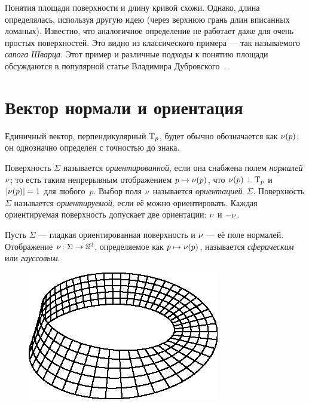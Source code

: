 Понятия площади поверхности и длину кривой схожи.
Однако, длина определялась, используя другую идею (через верхнюю грань длин вписанных ломаных).
Известно, что аналогичное определение не работает даже для очень простых поверхностей.
Это видно из классического примера --- так называемого \textit{сапога Шварца}.
Этот пример и различные подходы к понятию площади обсуждаются в популярной статье Владимира Дубровского~\cite{dubrovsky}.


 \section{Вектор нормали и ориентация}
 
Единичный вектор, перпендикулярный $\mathrm{T}_p$, будет обычно обозначается как $\nu(p)$;
он однозначно определён с точностью до знака.

Поверхность $\Sigma$ называется \emph{ориентированной}, если она снабжена полем  \emph{нормалей} $\nu$;
то есть таким непрерывным отображением $p\mapsto \nu(p)$, что $\nu(p)\perp\mathrm{T}_p$ и $|\nu(p)|=1$ для любого~$p$.
Выбор поля $\nu$ называется {}\emph{ориентацией}~$\Sigma$.
Поверхность $\Sigma$ называется {}\emph{ориентируемой}, если её можно ориентировать.
Каждая ориентируемая поверхность допускает две ориентации: $\nu$ и $-\nu$.

Пусть $\Sigma$ --- гладкая ориентированная поверхность и $\nu$ --- её поле нормалей.
Отображение $\nu\colon\Sigma\to \mathbb{S}^2$, определяемое как $p\mapsto \nu(p)$, называется \emph{сферическим} или \emph{гауссовым}.

\begin{figure}
\vskip-7mm
\centering
\includegraphics{asy/moebius}
\vskip-1mm
\end{figure}

